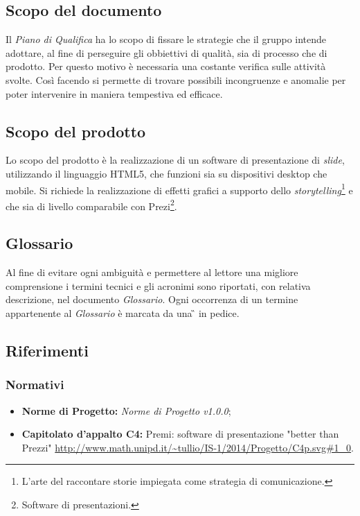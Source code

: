 \subsection{Scopo del documento}
Il \textit{Piano di Qualifica} ha lo scopo di fissare le strategie che il gruppo intende adottare, al fine di perseguire gli obbiettivi di qualità, sia di processo che di prodotto. Per questo motivo è necessaria una costante verifica sulle attività svolte. Così facendo si permette di trovare possibili incongruenze e anomalie per poter intervenire in maniera tempestiva ed efficace.
\subsection{Scopo del prodotto}
Lo scopo del prodotto è la realizzazione di un software di presentazione di \textit{slide}, utilizzando il linguaggio HTML5, che funzioni sia su dispositivi desktop che mobile. Si richiede la realizzazione di effetti grafici a supporto dello \textit{storytelling}\footnote{L'arte del raccontare storie impiegata come strategia di comunicazione.} e che sia di livello comparabile con Prezi\footnote{Software di presentazioni.}.
\subsection{Glossario}
Al fine di evitare ogni ambiguità e permettere al lettore una migliore comprensione i termini tecnici e gli acronimi sono riportati, con relativa descrizione, nel documento \textit{Glossario}. 
Ogni occorrenza di un termine appartenente al \textit{Glossario} è marcata da una \G{} in pedice.
\subsection{Riferimenti}
	\subsubsection{Normativi}
	\begin{itemize}
		\item \textbf{Norme di Progetto:} \textit{Norme di Progetto v1.0.0};
		\item \textbf{Capitolato d'appalto C4:} Premi: software di presentazione "better than Prezzi" \url{http://www.math.unipd.it/~tullio/IS-1/2014/Progetto/C4p.svg#1_0}.
	\end{itemize}
